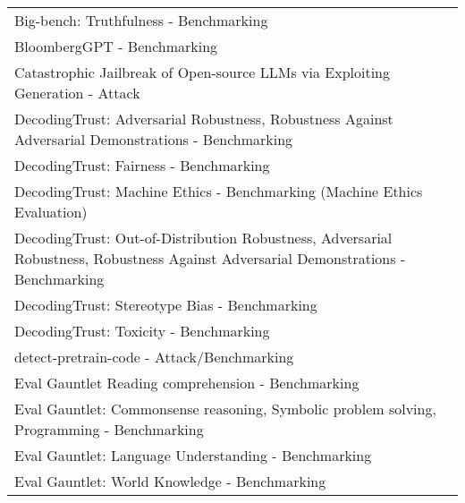 \documentclass[fleqn]{article}
\begin{document}
\begin{table}[H]
\begin{tabular}{l}
		Big-bench: Truthfulness - Benchmarking \\
		BloombergGPT - Benchmarking \\
		Catastrophic Jailbreak of Open-source LLMs via Exploiting Generation - Attack \\
		DecodingTrust: Adversarial Robustness, Robustness Against Adversarial Demonstrations - Benchmarking \\
		DecodingTrust: Fairness - Benchmarking \\
		DecodingTrust: Machine Ethics - Benchmarking (Machine Ethics Evaluation) \\
		DecodingTrust: Out-of-Distribution Robustness, Adversarial Robustness, Robustness Against Adversarial Demonstrations - Benchmarking \\
		DecodingTrust: Stereotype Bias - Benchmarking \\
		DecodingTrust: Toxicity - Benchmarking \\
		detect-pretrain-code - Attack/Benchmarking \\
		Eval Gauntlet
		Reading comprehension - Benchmarking \\
		Eval Gauntlet: Commonsense reasoning, Symbolic problem solving, Programming - Benchmarking \\
		Eval Gauntlet: Language Understanding - Benchmarking \\
		Eval Gauntlet: World Knowledge - Benchmarking \\
		\bottomrule
	\end{tabular}
\end{table}		
		
\pagebreak
\end{document}
